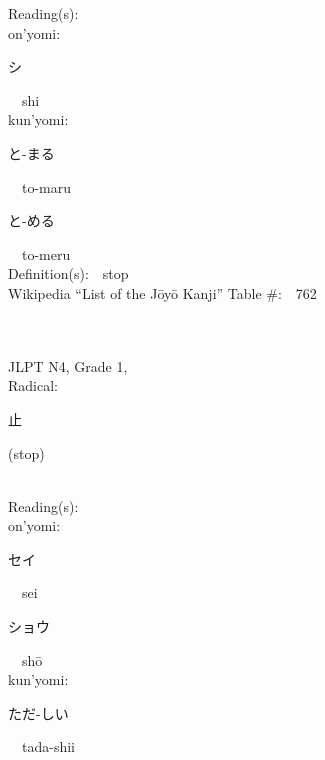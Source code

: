 \begin{multicols}{2}
Reading(s):\ \ \\
{\hspace*{1em}}on'yomi:\ \ \\
{\hspace*{2em}}{\begin{CJK}{UTF8}{min} シ \end{CJK}}\ \ shi\ \ \\
{\hspace*{1em}}kun'yomi:\ \ \\
{\hspace*{2em}}{\begin{CJK}{UTF8}{min} と-まる \end{CJK}}\ \ to-maru\ \ \\
{\hspace*{2em}}{\begin{CJK}{UTF8}{min} と-める \end{CJK}}\ \ to-meru\ \ \\
Definition(s):\ \ stop \\
Wikipedia ``List of the J\=oy\=o Kanji'' Table \#:\ \ 762 \\
\ \ \\
{\fontsize{34pt}{40pt}  }\ \ \\  %
{JLPT N4, Grade 1, \\Radical:\ \ {\begin{CJK}{UTF8}{min} 止 \end{CJK}} (stop) } \\
Reading(s):\ \ \\
{\hspace*{1em}}on'yomi:\ \ \\
{\hspace*{2em}}{\begin{CJK}{UTF8}{min} セイ \end{CJK}}\ \ sei\ \ \\
{\hspace*{2em}}{\begin{CJK}{UTF8}{min} ショウ \end{CJK}}\ \ sh\=o\ \ \\
{\hspace*{1em}}kun'yomi:\ \ \\
{\hspace*{2em}}{\begin{CJK}{UTF8}{min} ただ-しい \end{CJK}}\ \ tada-shii\ \ \\

\end{multicols}
